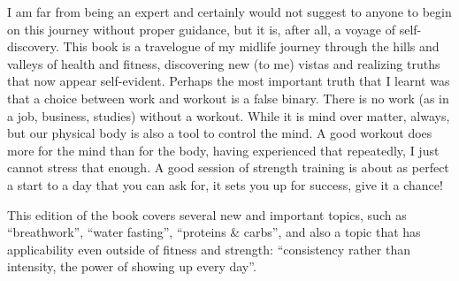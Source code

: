 \documentclass[
  oneside]{book}
\begin{document}
I am far from being an expert and certainly would not suggest to anyone to begin on this journey without proper guidance, but it is, after all, a voyage of self-discovery. This book is a travelogue of my midlife journey through the hills and valleys of health and fitness, discovering new (to me) vistas and realizing truths that now appear self-evident. Perhaps the most important truth that I learnt was that a choice between work and workout is a false binary. There is no work (as in a job, business, studies) without a workout. While it is mind over matter, always, but our physical body is also a tool to control the mind. A good workout does more for the mind than for the body, having experienced that repeatedly, I just cannot stress that enough. A good session of strength training is about as perfect a start to a day that you can ask for, it sets you up for success, give it a chance!

This edition of the book covers several new and important topics, such as ``breathwork'', ``water fasting'', ``proteins \& carbs'', and also a topic that has applicability even outside of fitness and strength: ``consistency rather than intensity, the power of showing up every day''.
\end{document}
